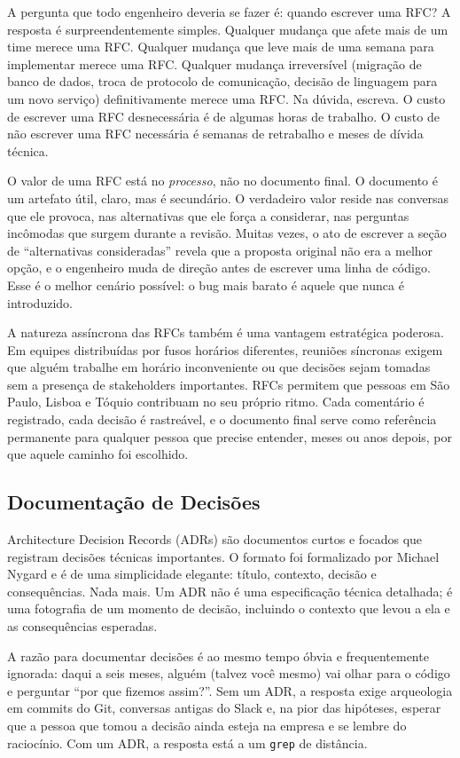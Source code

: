 A pergunta que todo engenheiro deveria se fazer é: quando escrever uma RFC?
A resposta é surpreendentemente simples. Qualquer mudança que afete mais de
um time merece uma RFC. Qualquer mudança que leve mais de uma semana para
implementar merece uma RFC. Qualquer mudança irreversível (migração de banco
de dados, troca de protocolo de comunicação, decisão de linguagem para um
novo serviço) definitivamente merece uma RFC. Na dúvida,
escreva. O custo de escrever uma RFC desnecessária é de algumas horas de
trabalho. O custo de não escrever uma RFC necessária é semanas de retrabalho
e meses de dívida técnica.

O valor de uma RFC está no \textit{processo}, não
no documento final. O documento é um artefato útil, claro, mas é secundário.
O verdadeiro valor reside nas conversas que ele provoca, nas alternativas que
ele força a considerar, nas perguntas incômodas que surgem durante a revisão.
Muitas vezes, o ato de escrever a seção de ``alternativas consideradas'' revela
que a proposta original não era a melhor opção, e o engenheiro muda de
direção antes de escrever uma linha de código. Esse é o melhor cenário
possível: o bug mais barato é aquele que nunca é introduzido.

A natureza assíncrona das RFCs também é uma vantagem estratégica poderosa.
Em equipes distribuídas por fusos horários diferentes, reuniões síncronas
exigem que alguém trabalhe em horário inconveniente ou que decisões sejam
tomadas sem a presença de stakeholders importantes. RFCs permitem que pessoas
em São Paulo, Lisboa e Tóquio contribuam no seu próprio ritmo. Cada
comentário é registrado, cada decisão é rastreável, e o documento final
serve como referência permanente para qualquer pessoa que precise entender,
meses ou anos depois, por que aquele caminho foi escolhido.

\subsection{Documentação de Decisões}

Architecture Decision Records (ADRs) são documentos curtos e focados que
registram decisões técnicas importantes. O formato foi formalizado por Michael
Nygard e é de uma simplicidade elegante: título, contexto, decisão e
consequências. Nada mais. Um ADR não é uma especificação técnica detalhada;
é uma fotografia de um momento de decisão, incluindo o contexto que levou a
ela e as consequências esperadas.

A razão para documentar decisões é ao mesmo tempo óbvia e frequentemente
ignorada: daqui a seis meses, alguém (talvez você mesmo) vai olhar para
o código e perguntar ``por que fizemos assim?''. Sem um ADR, a resposta
exige arqueologia em commits do Git, conversas antigas do Slack e, na pior
das hipóteses, esperar que a pessoa que tomou a decisão ainda esteja na
empresa e se lembre do raciocínio. Com um ADR, a resposta está a um
\texttt{grep} de distância.

